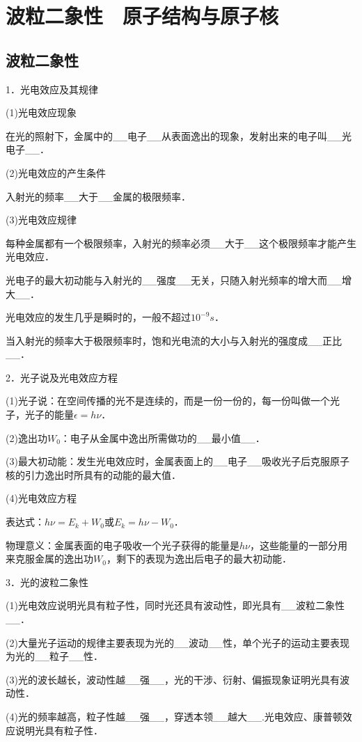 \chapter{波粒二象性　原子结构与原子核}
\section{波粒二象性}

1．光电效应及其规律

(1)光电效应现象

在光的照射下，金属中的\_\_电子\_\_从表面逸出的现象，发射出来的电子叫\_\_光电子\_\_．

(2)光电效应的产生条件

入射光的频率\_\_大于\_\_金属的极限频率．

(3)光电效应规律

每种金属都有一个极限频率，入射光的频率必须\_\_大于\_\_这个极限频率才能产生光电效应．

光电子的最大初动能与入射光的\_\_强度\_\_无关，只随入射光频率的增大而\_\_增大\_\_．

光电效应的发生几乎是瞬时的，一般不超过$10^{-9} s$．

当入射光的频率大于极限频率时，饱和光电流的大小与入射光的强度成\_\_正比\_\_．

2．光子说及光电效应方程

(1)光子说：在空间传播的光不是连续的，而是一份一份的，每一份叫做一个光子，光子的能量$\epsilon=h\nu$．

(2)逸出功$W_0$：电子从金属中逸出所需做功的\_\_最小值\_\_．

(3)最大初动能：发生光电效应时，金属表面上的\_\_电子\_\_吸收光子后克服原子核的引力逸出时所具有的动能的最大值．

(4)光电效应方程

表达式：$h\nu=E_k+W_0$或$E_k=h\nu-W_0$．

物理意义：金属表面的电子吸收一个光子获得的能量是$h\nu$，这些能量的一部分用来克服金属的逸出功$W_0$，剩下的表现为逸出后电子的最大初动能．

3．光的波粒二象性

(1)光电效应说明光具有粒子性，同时光还具有波动性，即光具有\_\_波粒二象性\_\_．

(2)大量光子运动的规律主要表现为光的\_\_波动\_\_性，单个光子的运动主要表现为光的\_\_粒子\_\_性．

(3)光的波长越长，波动性越\_\_强\_\_，光的干涉、衍射、偏振现象证明光具有波动性．

(4)光的频率越高，粒子性越\_\_强\_\_，穿透本领\_\_越大\_\_.光电效应、康普顿效应说明光具有粒子性．

